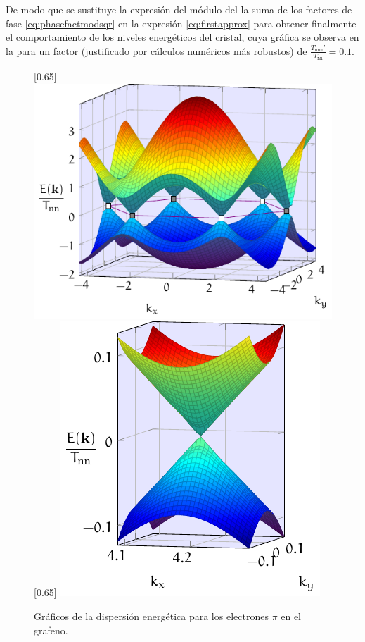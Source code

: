 De modo que se sustituye la expresión del módulo del la suma de los factores de fase 
\eqref{eq:phasefactmodsqr} en la expresión \eqref{eq:firstapprox} para obtener 
finalmente el comportamiento de los niveles energéticos del cristal, cuya gráfica se 
observa en la  para un factor (justificado por cálculos 
numéricos más robustos) de $ \frac{T_{\mathtt{nnn}}'}{T_{\mathtt{nn}}} = 0.1 $.
\begin{figure}[p]
	\Centering
	[0.65\textwidth]{
		\includegraphics{./img/BandGraph.pdf}
	}\\
	[0.65\textwidth]{
		\includegraphics{./img/DiracValley.pdf}
	}
\caption{\label{fig:BandGraphs}Gráficos de la dispersión energética para los electrones $ \pi $ en el grafeno.}
\end{figure}


